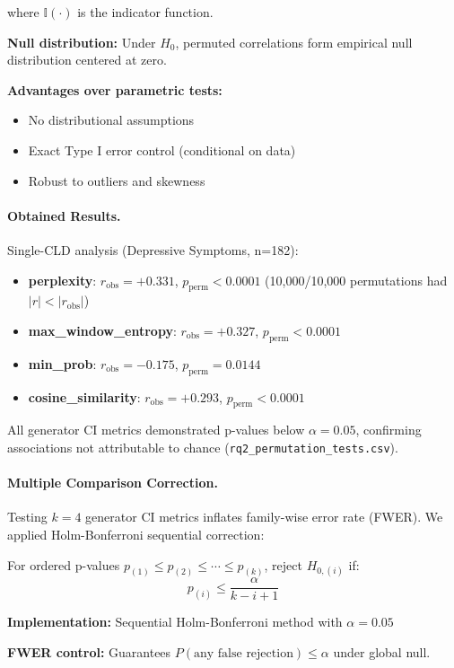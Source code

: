 where \(\mathbb{I}(\cdot)\) is the indicator function.

\textbf{Null distribution:} Under \(H_0\), permuted correlations form empirical null distribution centered at zero.

\textbf{Advantages over parametric tests:}
\begin{itemize}
    \item No distributional assumptions
    \item Exact Type I error control (conditional on data)
    \item Robust to outliers and skewness
\end{itemize}

\paragraph{Obtained Results.} Single-CLD analysis (Depressive Symptoms, n=182):
\begin{itemize}
    \item \textbf{perplexity}: \(r_{\text{obs}} = +0.331\), \(p_{\text{perm}} < 0.0001\) (10,000/10,000 permutations had \(|r| < |r_{\text{obs}}|\))
    \item \textbf{max\_window\_entropy}: \(r_{\text{obs}} = +0.327\), \(p_{\text{perm}} < 0.0001\)
    \item \textbf{min\_prob}: \(r_{\text{obs}} = -0.175\), \(p_{\text{perm}} = 0.0144\)
    \item \textbf{cosine\_similarity}: \(r_{\text{obs}} = +0.293\), \(p_{\text{perm}} < 0.0001\)
\end{itemize}

All generator CI metrics demonstrated p-values below \(\alpha = 0.05\), confirming associations not attributable to chance (\texttt{rq2\_permutation\_tests.csv}).

\paragraph{Multiple Comparison Correction.} Testing \(k = 4\) generator CI metrics inflates family-wise error rate (FWER). We applied Holm-Bonferroni sequential correction:

For ordered p-values \(p_{(1)} \leq p_{(2)} \leq \cdots \leq p_{(k)}\), reject \(H_{0,(i)}\) if:
\[
p_{(i)} \leq \frac{\alpha}{k - i + 1}
\]

\textbf{Implementation:} Sequential Holm-Bonferroni method with \(\alpha = 0.05\)

\textbf{FWER control:} Guarantees \(P(\text{any false rejection}) \leq \alpha\) under global null.

